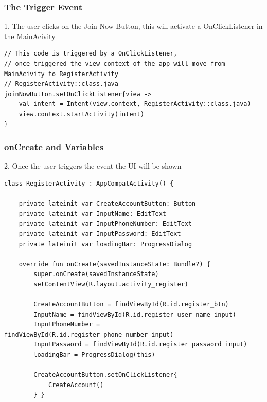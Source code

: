 \subsubsection{The Trigger Event}
1. The user clicks on the Join Now Button, this will activate a OnClickListener in the MainAcivity
\begin{verbatim}
// This code is triggered by a OnClickListener, 
// once triggered the view context of the app will move from MainAcivity to RegisterActivity
// RegisterActivity::class.java
joinNowButton.setOnClickListener{view ->
    val intent = Intent(view.context, RegisterActivity::class.java)
    view.context.startActivity(intent)
}
\end{verbatim}

\subsubsection{onCreate and Variables}
2. Once the user triggers the event the UI will be shown
\begin{verbatim}
class RegisterActivity : AppCompatActivity() {

    private lateinit var CreateAccountButton: Button
    private lateinit var InputName: EditText
    private lateinit var InputPhoneNumber: EditText
    private lateinit var InputPassword: EditText
    private lateinit var loadingBar: ProgressDialog

    override fun onCreate(savedInstanceState: Bundle?) {
        super.onCreate(savedInstanceState)
        setContentView(R.layout.activity_register)

        CreateAccountButton = findViewById(R.id.register_btn)
        InputName = findViewById(R.id.register_user_name_input)
        InputPhoneNumber = findViewById(R.id.register_phone_number_input)
        InputPassword = findViewById(R.id.register_password_input)
        loadingBar = ProgressDialog(this)

        CreateAccountButton.setOnClickListener{
            CreateAccount()
        } }
\end{verbatim}

